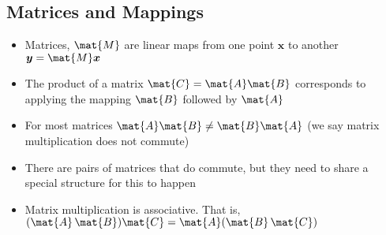 \documentclass[11pt]{article}
\begin{document}
\subsection{Matrices and Mappings}
\label{sec:orgb50cb5a}
\begin{itemize}
\item Matrices, \(\mat{M}\) are linear maps from one point \(\bm{x}\) to
another \(\bm{y}=\mat{M}\bm{x}\)
\item The product of a matrix \(\mat{C}  = \mat{A}\mat{B}\) corresponds
to applying the mapping \(\mat{B}\) followed by \(\mat{A}\)
\item For most matrices \(\mat{A}\mat{B} \neq \mat{B}\mat{A}\) (we say
matrix multiplication does not commute)
\item There are pairs of matrices that do commute, but they need to
share a special structure for this to happen
\item Matrix multiplication is associative.  That is, \((\mat{A}\,\mat{B})\mat{C} = \mat{A} (\mat{B}\, \mat{C})\)
\end{itemize}
\end{document}
